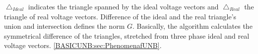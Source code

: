             $\bigtriangleup_{Ideal}$ indicates the triangle spanned by the ideal voltage vectors and $\bigtriangleup_{Real}$ the triangle of real voltage vectors. Difference of the ideal and the real triangle's union and intersection defines the norm $G$. Basically, the algorithm calculates the symmetrical difference of the triangles, stretched from three phase ideal and real voltage vectors.  \ref{BASICUNB:sec:PhenomenafUNB}.

            \begin{figure}[!ht]
           \centering

\end{figure}
